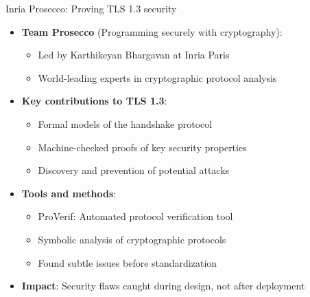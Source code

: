 \documentclass[aspectratio=169, lualatex, handout]{beamer}
\begin{document}
\begin{frame}{Inria Prosecco: Proving TLS 1.3 security}
	\begin{itemize}
		\item \textbf{Team Prosecco} (Programming securely with cryptography):
		      \begin{itemize}
			      \item Led by Karthikeyan Bhargavan at Inria Paris
			      \item World-leading experts in cryptographic protocol analysis
		      \end{itemize}
		\item \textbf{Key contributions to TLS 1.3}:
		      \begin{itemize}
			      \item Formal models of the handshake protocol
			      \item Machine-checked proofs of key security properties
			      \item Discovery and prevention of potential attacks
		      \end{itemize}
		\item \textbf{Tools and methods}:
		      \begin{itemize}
			      \item ProVerif: Automated protocol verification tool
			      \item Symbolic analysis of cryptographic protocols
			      \item Found subtle issues before standardization
		      \end{itemize}
		\item \textbf{Impact}: Security flaws caught during design, not after deployment
	\end{itemize}
\end{frame}
\end{document}
